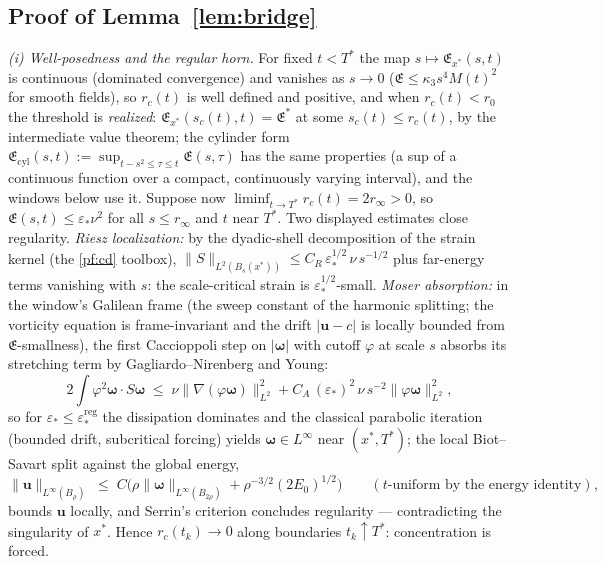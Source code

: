 \documentclass[11pt,letterpaper]{amsart}
\theoremstyle{definition}
\theoremstyle{remark}
\newcommand{\vort}{\boldsymbol{\omega}}
\newcommand{\uu}{\boldsymbol{u}}
\newcommand{\norm}[1]{\lVert #1 \rVert}
\newcommand{\abs}[1]{\lvert #1 \rvert}
\begin{document}
\subsection{Proof of Lemma~\ref{lem:bridge}}\label{pf:bridge}
\emph{(i) Well-posedness and the regular horn.} For fixed $t<T^*$ the map
$s\mapsto\mathfrak{E}_{x^*}(s,t)$ is continuous (dominated convergence) and
vanishes as $s\to0$ ($\mathfrak{E}\le\kappa_3s^4M(t)^2$ for smooth fields), so
$r_c(t)$ is well defined and positive, and when $r_c(t)<r_0$ the threshold is
\emph{realized}: $\mathfrak{E}_{x^*}(s_c(t),t)=\mathfrak{E}^*$ at some
$s_c(t)\le r_c(t)$, by the intermediate value theorem; the cylinder form
$\mathfrak{E}_{\mathrm{cyl}}(s,t):=\sup_{t-s^2\le\tau\le t}\mathfrak{E}(s,\tau)$
has the same properties (a sup of a continuous function over a compact,
continuously varying interval), and the windows below use it. Suppose now
$\liminf_{t\to T^*}r_c(t)=2r_\infty>0$, so
$\mathfrak{E}(s,t)\le\varepsilon_*\nu^2$ for all $s\le r_\infty$ and $t$ near
$T^*$. Two displayed estimates close regularity. \emph{Riesz localization:}
by the dyadic-shell decomposition of the strain kernel (the \cref{pf:cd}
toolbox),
$\norm{S}_{L^2(B_s(x^*))}\le C_R\,\varepsilon_*^{1/2}\,\nu\,s^{-1/2}$ plus
far-energy terms vanishing with $s$: the scale-critical strain is
$\varepsilon_*^{1/2}$-small. \emph{Moser absorption:} in the window's Galilean
frame (the sweep constant of the harmonic splitting; the vorticity equation is
frame-invariant and the drift $\abs{\uu-c}$ is locally bounded from
$\mathfrak{E}$-smallness), the first Caccioppoli step on $\abs{\vort}$ with
cutoff $\varphi$ at scale $s$ absorbs its stretching term by
Gagliardo--Nirenberg and Young:
\[
2\!\int\!\varphi^2\vort\cdot S\vort
\;\le\;\nu\norm{\nabla(\varphi\vort)}_{L^2}^2
+C_A\,(\varepsilon_*)^2\,\nu\,s^{-2}\norm{\varphi\vort}_{L^2}^2 ,
\]
so for $\varepsilon_*\le\varepsilon_*^{\mathrm{reg}}$ the dissipation dominates
and the classical parabolic iteration (bounded drift, subcritical forcing)
yields $\vort\in L^\infty$ near $(x^*,T^*)$; the local Biot--Savart split
against the global energy,
\[
\norm{\uu}_{L^\infty(B_\rho)}\;\le\;C\bigl(\rho\norm{\vort}_{L^\infty(B_{2\rho})}
+\rho^{-3/2}(2E_0)^{1/2}\bigr)
\qquad(t\text{-uniform by the energy identity}),
\]
bounds $\uu$ locally, and Serrin's criterion
concludes regularity --- contradicting the singularity of $x^*$. Hence
$r_c(t_k)\to0$ along boundaries $t_k\uparrow T^*$: concentration is forced.
\end{document}
